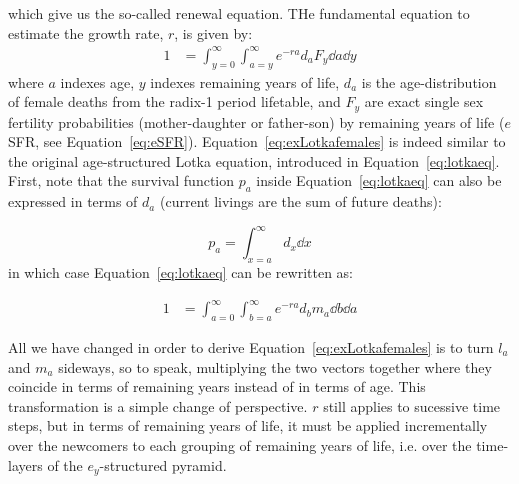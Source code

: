 which give us the so-called renewal equation. THe fundamental equation to
estimate the growth rate, $r$, is given by:
\begin{align}
\label{eq:exLotkafemales}
1 &= \int _{y=0}^\infty \int _{a=y}^\infty e^{-ra} d_{a} F_{y} \dd a \dd y
\end{align}
where $a$ indexes age, $y$ indexes remaining years of life,
$d_{a}$ is the age-distribution of female deaths from the radix-1 period
lifetable, and $F_{y}$ are exact single sex fertility probabilities
(mother-daughter or father-son) by remaining years of
life ($e$SFR, see Equation~\eqref{eq:eSFR}). Equation~\ref{eq:exLotkafemales} is indeed similar to the
original age-structured Lotka equation, introduced in
Equation~\eqref{eq:lotkaeq}. First, note that the survival function $p_a$
inside Equation~\ref{eq:lotkaeq} can also be expressed in terms of
$d_a$ (current livings are the sum of future deaths):

\begin{equation}
p_a = \int _{x = a} ^\infty d_x \dd x
\end{equation}
in which case Equation~\ref{eq:lotkaeq} can be rewritten as:

\begin{align}
\label{eq:lotkadx}
1 &= \int _{a=0}^\infty \int _{b = a}^\infty e^{-ra} d_b m_a \dd b \dd a
\end{align}

All we have changed in order to derive Equation~\ref{eq:exLotkafemales}
is to turn $l_a$ and $m_a$ sideways, so to speak, multiplying the two vectors
together where they coincide in terms of remaining years instead of in terms of age. This
transformation is a simple change of perspective. $r$ still applies to sucessive 
time steps, but in terms of remaining years of life, it must be applied incrementally 
over the newcomers to
each grouping of remaining years of life, i.e. over the time-layers of the
$e_y$-structured pyramid.
